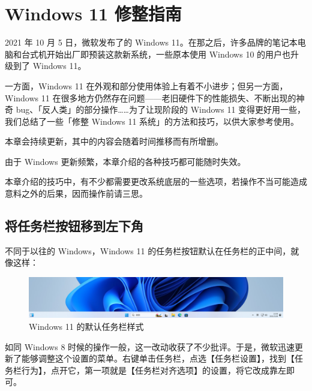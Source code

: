 \chapter{Windows 11 修整指南}
\label{cha:windows-11-optimization}

\begin{intro}
  2021 年 10 月 5 日，微软发布了的 Windows 11。在那之后，许多品牌的笔记本电脑和台式机开始出厂即预装这款新系统，一些原本使用 Windows 10 的用户也升级到了 Windows 11。

  一方面，Windows 11 在外观和部分使用体验上有着不小进步；但另一方面，Windows 11 在很多地方仍然存在问题——老旧硬件下的性能损失、不断出现的神奇 bug、「反人类」的部分操作……为了让现阶段的 Windows 11 变得更好用一些，我们总结了一些「修整 Windows 11 系统」的方法和技巧，以供大家参考使用。
\end{intro}

\begin{warning}
  本章会持续更新，其中的内容会随着时间推移而有所增删。

  由于 Windows 更新频繁，本章介绍的各种技巧都可能随时失效。
\end{warning}

\begin{dangerbox}
  本章介绍的技巧中，有不少都需要更改系统底层的一些选项，若操作不当可能造成意料之外的后果，因而操作前请三思。
\end{dangerbox}

\section{将任务栏按钮移到左下角}

不同于以往的 Windows，Windows 11 的任务栏按钮默认在任务栏的正中间，就像这样：

\begin{figure}[htb!]
  \centering
  \includegraphics[width=.9\textwidth]{assets/advanced/taskbar.png}
  \caption{Windows 11 的默认任务栏样式}
  \label{fig:taskbar}
\end{figure}

如同 Windows 8 时候的操作一般，这一改动收获了不少批评。于是，微软迅速更新了能够调整这个设置的菜单。右键单击任务栏，点选【任务栏设置】，找到【任务栏行为】，点开它，第一项就是【任务栏对齐选项】的设置，将它改成靠左即可。

